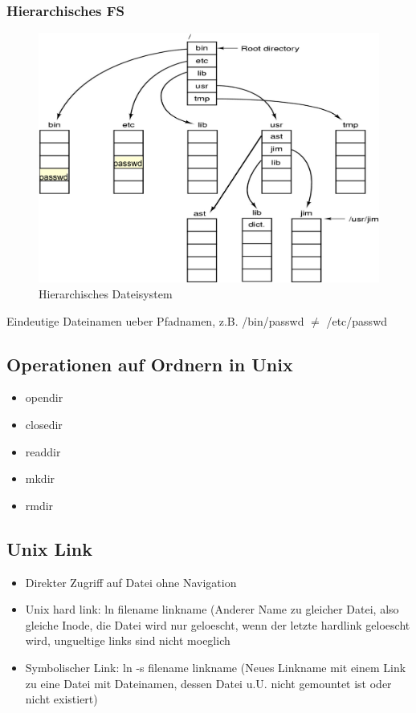\documentclass[a4paper]{scrreprt}
\begin{document}
\subsubsection{Hierarchisches FS}
\begin{figure}[ht]
\centering
\includegraphics[scale=0.25]{graphics/hierarchical_fs.png}
\caption{Hierarchisches Dateisystem}
\end{figure}
Eindeutige Dateinamen ueber Pfadnamen, z.B. /bin/passwd $\neq$ /etc/passwd

\subsection{Operationen auf Ordnern in Unix}
\begin{itemize}
	\item opendir
	\item closedir
	\item readdir
	\item mkdir
	\item rmdir
\end{itemize}

\subsection{Unix Link}
\begin{itemize}
	\item Direkter Zugriff auf Datei ohne Navigation
	\item Unix hard link: ln filename linkname (Anderer Name zu gleicher Datei, also gleiche Inode, die Datei wird nur geloescht, wenn der letzte hardlink geloescht wird, ungueltige links sind nicht moeglich
	\item Symbolischer Link: ln -s filename linkname (Neues Linkname mit einem Link zu eine Datei mit Dateinamen, dessen Datei u.U. nicht gemountet ist oder nicht existiert)
\end{itemize}
\end{document}
